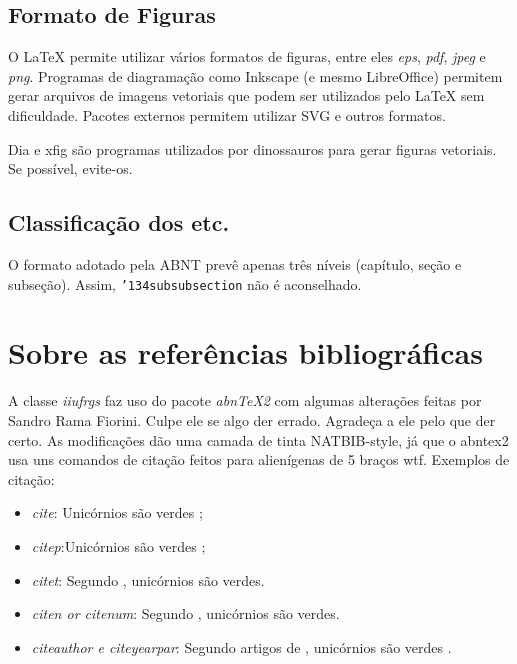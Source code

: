 \documentclass[ppgc,ti]{iiufrgs}
\begin{document}
\subsection{Formato de Figuras}
\label{sec:fig_format}

O LaTeX permite utilizar vários formatos de figuras, entre eles \emph{eps}, \emph{pdf}, \emph{jpeg} e \emph{png}. Programas de diagramação como Inkscape (e mesmo LibreOffice) permitem gerar arquivos de imagens vetoriais que podem ser utilizados pelo LaTeX sem dificuldade. Pacotes externos permitem utilizar SVG e outros formatos.

Dia e xfig são programas utilizados por dinossauros para gerar figuras vetoriais. Se possível, evite-os.

\subsection{Classificação dos etc.}

O formato adotado pela ABNT prevê apenas três níveis (capítulo, seção e subseção). Assim, \texttt{\char'134subsubsection} não é aconselhado.

\section{Sobre as referências bibliográficas}

A classe \emph{iiufrgs} faz uso do pacote \emph{abnTeX2} com algumas alterações
feitas por Sandro Rama Fiorini. Culpe ele se algo der errado. Agradeça a ele
pelo que der certo. As modificações dão uma camada de tinta NATBIB-style,
já que o abntex2 usa uns comandos de citação feitos para alienígenas de 5 braços 
wtf. Exemplos de citação:

\begin{itemize}
    \item \emph{cite}: Unicórnios são verdes \cite{Adams2009Conceptual};
    \item \emph{citep}:Unicórnios são verdes \citep{Adams2009Conceptual};
    \item \emph{citet}: Segundo \citet{Adams2009Conceptual}, unicórnios são
                        verdes.
    \item \emph{citen or citenum}: Segundo ,
        unicórnios são verdes.
    \item \emph{citeauthor e citeyearpar}: Segundo artigos de
        \citeauthor{Adams2009Conceptual} , unicórnios são verdes 
        \citeyearpar{Adams2009Conceptual}.

\end{itemize}
\end{document}
